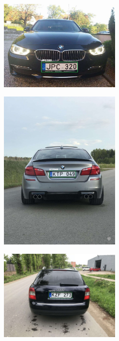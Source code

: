 \documentclass{VUMIFInfBakalaurinis}
\begin{document}
\begin{subfigure}{\linewidth}
  \centering
  \includegraphics[width=6cm]{cars/jpc320.jpg}
  \label{JPC320}
\end{subfigure}
\begin{subfigure}{\linewidth}
  \centering
  \includegraphics[width=6cm]{cars/ktp049.jpg}
  \label{KTP049}
\end{subfigure}
\begin{subfigure}{\linewidth}
  \centering
  \includegraphics[width=6cm]{cars/kzf273.jpg}
  \label{KZF273}
\end{subfigure}
\end{document}
